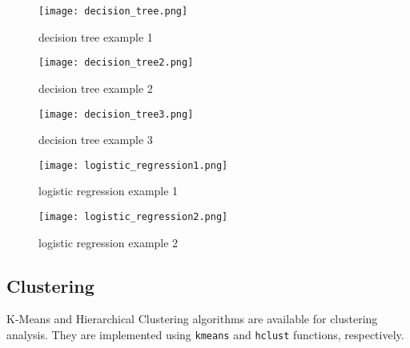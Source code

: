 \documentclass{article}
\begin{document}
\begin{figure}
    \centering
    \texttt{[image: decision\_tree.png]}
    \caption{decision tree example 1}
    \label{fig:Classification}
\end{figure}

\begin{figure}
    \centering
    \texttt{[image: decision\_tree2.png]}
    \caption{decision tree example 2}
    \label{fig:Classification}
\end{figure}

\begin{figure}
    \centering
    \texttt{[image: decision\_tree3.png]}
    \caption{decision tree example 3}
    \label{fig:Classification}
\end{figure}

\begin{figure}
    \centering
    \texttt{[image: logistic\_regression1.png]}
    \caption{logistic regression example 1}
    \label{fig:Classification}
\end{figure}

\begin{figure}
    \centering
    \texttt{[image: logistic\_regression2.png]}
    \caption{logistic regression example 2}
    \label{fig:Classification}
\end{figure}

\FloatBarrier

\subsection{Clustering}
K-Means and Hierarchical Clustering algorithms are available for clustering analysis. They are implemented using \texttt{kmeans} and \texttt{hclust} functions, respectively.
\end{document}
